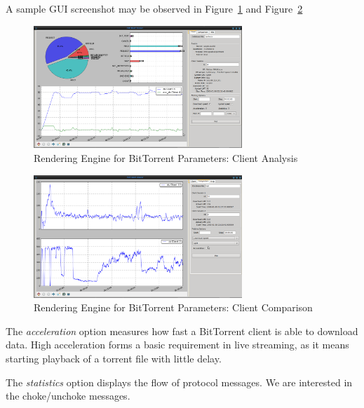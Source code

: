 A sample GUI screenshot may be observed in
Figure~\ref{fig:proto-measure:processing-gui-1} and
Figure~\ref{fig:proto-measure:processing-gui-2}

\begin{figure}[h]
  \begin{center}
    \includegraphics[width=0.7\textwidth]{src/img/proto-measure/processing-gui-1}
  \end{center}
  \caption{Rendering Engine for BitTorrent Parameters: Client Analysis}
  \label{fig:proto-measure:processing-gui-1}
\end{figure}

\begin{figure}[h]
  \begin{center}
    \includegraphics[width=0.7\textwidth]{src/img/proto-measure/processing-gui-2}
  \end{center}
  \caption{Rendering Engine for BitTorrent Parameters: Client Comparison}
  \label{fig:proto-measure:processing-gui-2}
\end{figure}

The \textit{acceleration} option measures how fast a BitTorrent client is able
to download data. High acceleration forms a basic requirement in live
streaming, as it means starting playback of a torrent file with little delay.

The \textit{statistics} option displays the flow of protocol messages. We are
interested in the choke/unchoke messages.

